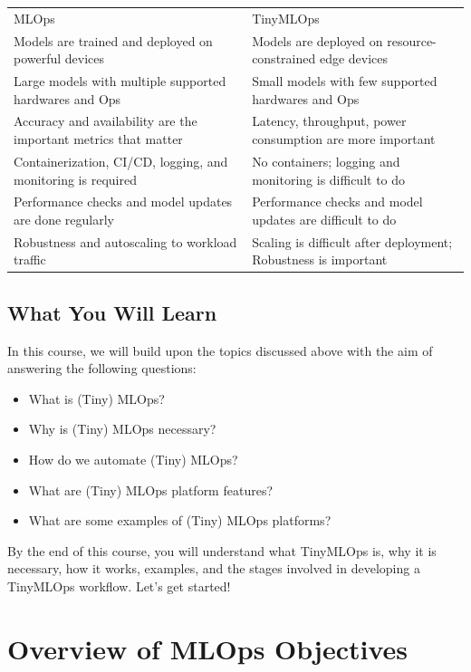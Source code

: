 \begin{tabular}{ll}
    MLOps & TinyMLOps \\
    Models are trained and deployed on powerful devices & Models are deployed on resource-constrained edge devices \\
    Large models with multiple supported hardwares and Ops & 
    Small models with few supported hardwares and Ops \\
    Accuracy and availability are the important metrics that matter
    & Latency, throughput, power consumption are more important \\
    Containerization, CI/CD, logging, and monitoring is required
    &
    No containers; logging and monitoring is difficult to do
    \\
    Performance checks and model updates are done regularly
    &
    Performance checks and model updates are difficult to do
    \\
    Robustness and autoscaling to workload traffic
    &
    Scaling is difficult after deployment; Robustness is important
    \\
\end{tabular}

\subsection{What You Will Learn}

In this course, we will build upon the topics discussed above with the aim of answering the following questions:

\begin{itemize}
    \item What is (Tiny) MLOps?
    \item Why is (Tiny) MLOps necessary?
    \item How do we automate (Tiny) MLOps?
    \item What are (Tiny) MLOps platform features?
    \item What are some examples of (Tiny) MLOps platforms?
\end{itemize}

By the end of this course, you will understand what TinyMLOps is, why it is necessary, how it works, examples, and the stages involved in developing a TinyMLOps workflow. Let’s get started!


\section{Overview of MLOps Objectives}

